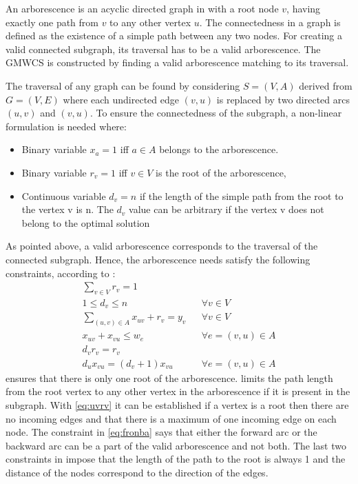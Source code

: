\documentclass[msthesis.tex]{subfiles}
\begin{document}
An arborescence is an acyclic directed graph in with a root node $v$, having exactly one path from $v$ to any other vertex $u$. The connectedness in a graph is defined as the existence of a simple path between any two nodes. For creating a valid connected subgraph, its traversal has to be a valid arborescence. The \gls{GMWCS} is constructed by finding a valid arborescence matching to its traversal.

The traversal of any graph can be found by considering $S = (V,A)$ derived from $G=(V,E)$  where each undirected edge $(v,u)$ is replaced by two directed arcs $(u,v)$ and $(v,u)$. To ensure the connectedness of the subgraph, a non-linear formulation is needed where:
\begin{itemize}
     \setlength\itemsep{0.5em}
    \item Binary variable $x_a = 1$ iff $a \in A$ belongs to the arborescence.
    \item Binary variable $r_v = 1$ iff $v \in V$ is the root of the arborescence,
    \item Continuous variable $d_v = n$ if the length of the simple path from the root to the vertex v is n. The $d_v$ value can be arbitrary if the vertex v does not belong to the optimal solution
\end{itemize}
As pointed above, a valid arborescence corresponds to the traversal of the connected subgraph. Hence, the arborescence needs satisfy the following constraints, according to \cite{haouari2013enhanced}:
\begin{align}
    \label{eq:rv}
    \sum_{v \in V} r_v = 1\\
    \label{eq:dv}
    1 \leq d_v \leq n && \forall v \in V \\
    \label{eq:uvrv}
    \sum_{(u,v) \in A} x_{uv} + r_v = y_v && \forall v \in V\\
    \label{eq:fronba}
    x_{uv} + x_{vu} \leq w_e && \forall e =(v,u) \in A\\
    \label{eq:dvrv}
    d_v r_v = r_v\\
    \label{eq:dudv}
    d_u x_{vu} = (d_v + 1) x_{vu} && \forall e=(v, u) \in A
\end{align}
  ensures that there is only one root of the arborescence.  limits the path length from the root vertex to any other vertex in the arborescence if it is present in the subgraph. With \cref{eq:uvrv} it can be established if a vertex is a root then there are no incoming edges and that there is a maximum of one incoming edge on each node. The constraint in \cref{eq:fronba} says that either the forward arc or the backward arc can be a part of the valid arborescence and not both. The last two constraints in  impose that the length of the path to the root is always 1 and the distance of the nodes correspond to the direction of the edges.
\end{document}
